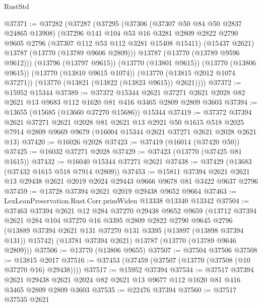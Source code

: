 \begin{lexlean}{RustStd}
\begin{coremodule}
@37371 := @37282
    (@37287
      (@37295
        (@37306
          (@37307 @50 @84 @50 @2837 @24865 @13908)
          (@37296
            @141
            @104
            @53
            @16
            @3281
            @2809
            @2822
            @2790
            @9605
            @2796
            (@37307 @112 @53 @112 @3281 @15408 @15411)
            (@15437 @2621)
            @13787
            (@13770 (@13789 @9606 @2809)))
          @13787
          (@13770 (@13789 @9596 @9612)))
        (@13796 (@13797 @9615))
        (@13770 (@13801 @9615))
        (@13770 (@13806 @9615))
        (@13770 (@13810 @9615 @1074))
        (@13770 (@13815 @2012 @1074 @37271))
        (@13770 (@13821 (@13822 (@13823 @9615)) @2621))))
@37372 := @15952 @15344
@37389 := @37372
    @15344
    @2621
    @37271
    @2621
    @2028
    @82
    @2621
    @13
    @9683
    @112
    @1620
    @81
    @416
    @3465
    @2809
    @2809
    @3603
@37394 := @13655 (@15685 (@13660 @37270 @15686)) @15344
@37419 := @37372
    @37394
    @2621
    @37271
    @2621
    @2028
    @81
    @2621
    @13
    @2921
    @50
    @1615
    @518
    @2025
    @7914
    @2809
    @9669
    @9679
    (@16004 @15344 @2621 @37271 @2621 @2028 @2621 @13)
@37420 := @16026 @2028
@37423 := @37419 (@16014 (@37420 @50))
@37425 := @16032 @37271 @2028
@37429 := @37423 (@13770 (@37425 @81 @1615))
@37432 := @16040 @15344 @37271 @2621
@37438 := @37429 (@13683 (@37432 @1615 @518 @7914 @2809))
@37453 := @15811
    @37394
    @2621
    @2621
    @13
    @29438
    @2621
    @2019
    @2024
    @29443
    @9666
    @9678
    @81
    @3422
    @9637
    @2796
@37459 := @13728 @37394 @2621 @2019 @29438 @9652 @9664
@37463 := LexLeanPreservation.Rust.Corr.primWiden @13338 @13340 @13342
@37504 := @37463
    @37394
    @2621
    @12
    @284
    @37270
    @29438
    @9652
    @9659
    (@13712
      @37394
      @2621
      @284
      @104
      @37270
      @16
      @3395
      @2809
      @2822
      @2790
      @9645
      @2796
      (@13889 @37394 @2621 @131 @37270 @131 @3395 (@13897 (@13898 @37394 @131)) @15742)
      (@13781 @37394 @2621)
      @13787
      (@13770 (@13789 @9646 @2809)))
@37506 := @13770 (@13806 @9655)
@37507 := @37504 @37506
@37508 := @13815 @2017
@37516 := @37453 (@37459 (@37507 (@13770 (@37508 (@10 @37270 @16) @29438))))
@37517 := @15952 @37394
@37534 := @37517
    @37394
    @2621
    @29438
    @2621
    @2024
    @82
    @2621
    @13
    @9677
    @112
    @1620
    @81
    @416
    @3465
    @2809
    @2809
    @3603
@37535 := @22476 @37394
@37560 := @37517
    @37535
    @2621

\end{coremodule}
\end{lexlean}
